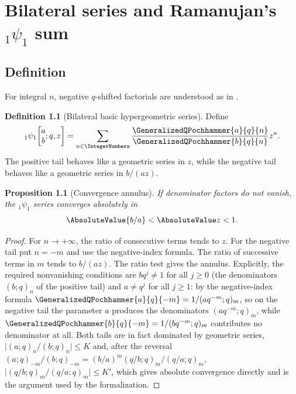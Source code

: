 \documentclass[11pt,a4paper,oneside,openany]{book}
\newtheorem{proposition}[proposition]{Proposition}
\theoremstyle{definition}
\newtheorem{definition}[definition]{Definition}
\theoremstyle{remark}
\begin{document}


\chapter{Bilateral series and Ramanujan's \texorpdfstring{${}_1\psi_1$}{1psi1} sum}\label{chap:bilateral}

\section{Definition}

For integral $n$, negative $q$-shifted factorials are understood as in
.
\begin{definition}[Bilateral basic hypergeometric series]
\label{qg:def-bilateral-basic-hypergeometric}
Define
\[
 {}_1\psi_1\!\left[\begin{matrix}a\\b\end{matrix};q,z\right]
 =\sum_{n\in\IntegerNumbers}
   \frac{\GeneralizedQPochhammer{a}{q}{n}}
        {\GeneralizedQPochhammer{b}{q}{n}}z^n.
\]
The positive tail behaves like a geometric series in $z$, while the negative tail behaves like a geometric series in $b/(az)$.
\end{definition}

\begin{proposition}[Convergence annulus]\label{prop:1psi1-convergence}
If denominator factors do not vanish, the ${}_1\psi_1$ series converges absolutely in
\[
 \AbsoluteValue{b/a}<\AbsoluteValue z<1.
\]
\end{proposition}

\begin{proof}
For $n\to+\infty$, the ratio of consecutive terms tends to $z$.  For the negative tail put $n=-m$ and use the negative-index formula.  The ratio of successive terms in $m$ tends to $b/(az)$.  The ratio test gives the annulus.
Explicitly, the required nonvanishing conditions are $bq^{j}\ne1$ for all
$j\ge0$ (the denominators $(b;q)_n$ of the positive tail) and $a\ne q^{j}$
for all $j\ge1$: by the negative-index formula
$\GeneralizedQPochhammer{a}{q}{-m}=1/(aq^{-m};q)_m$, so on the negative tail
the parameter $a$ produces the denominators $(aq^{-m};q)_m$, while
$\GeneralizedQPochhammer{b}{q}{-m}=1/(bq^{-m};q)_m$ contributes no
denominator at all.  Both tails are in fact dominated by geometric series,
$\bigl|(a;q)_n/(b;q)_n\bigr|\le K$ and, after the reversal
$(a;q)_{-m}/(b;q)_{-m}=(b/a)^m(q/b;q)_m/(q/a;q)_m$,
$\bigl|(q/b;q)_m/(q/a;q)_m\bigr|\le K'$, which gives absolute convergence
directly and is the argument used by the formalization.
\end{proof}
\end{document}
